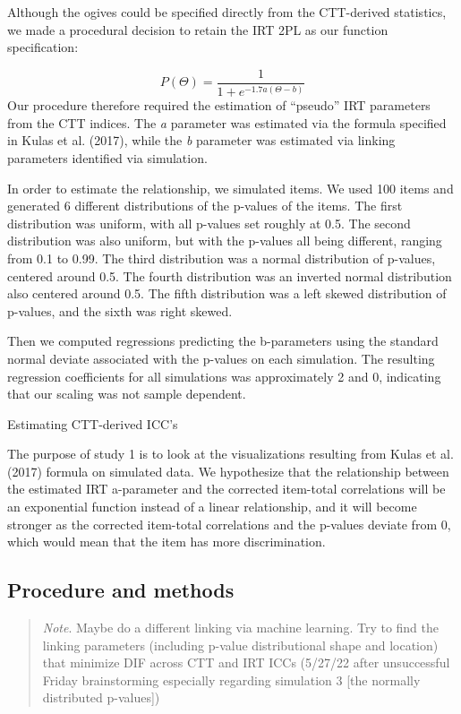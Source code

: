 \documentclass[
  man]{apa6}
\begin{document}
Although the ogives could be specified directly from the CTT-derived statistics, we made a procedural decision to retain the IRT 2PL as our function specification:

\[P(\Theta)=\frac{1}{1+e^{-1.7a(\Theta-b)}}\]
Our procedure therefore required the estimation of ``pseudo'' IRT parameters from the CTT indices. The \emph{a} parameter was estimated via the formula specified in Kulas et al. (2017), while the \emph{b} parameter was estimated via linking parameters identified via simulation.

In order to estimate the relationship, we simulated items. We used 100 items and generated 6 different distributions of the p-values of the items. The first distribution was uniform, with all p-values set roughly at 0.5. The second distribution was also uniform, but with the p-values all being different, ranging from 0.1 to 0.99. The third distribution was a normal distribution of p-values, centered around 0.5. The fourth distribution was an inverted normal distribution also centered around 0.5. The fifth distribution was a left skewed distribution of p-values, and the sixth was right skewed.

Then we computed regressions predicting the b-parameters using the standard normal deviate associated with the p-values on each simulation. The resulting regression coefficients for all simulations was approximately 2 and 0, indicating that our scaling was not sample dependent.

Estimating CTT-derived ICC's

The purpose of study 1 is to look at the visualizations resulting from Kulas et al. (2017) formula on simulated data. We hypothesize that the relationship between the estimated IRT a-parameter and the corrected item-total correlations will be an exponential function instead of a linear relationship, and it will become stronger as the corrected item-total correlations and the p-values deviate from 0, which would mean that the item has more discrimination.

\hypertarget{procedure-and-methods}{%
\subsection{Procedure and methods}\label{procedure-and-methods}}

\begin{quote}
\emph{Note}. Maybe do a different linking via machine learning. Try to find the linking parameters (including p-value distributional shape and location) that minimize DIF across CTT and IRT ICCs (5/27/22 after unsuccessful Friday brainstorming especially regarding simulation 3 {[}the normally distributed p-values{]})
\end{quote}
\end{document}
